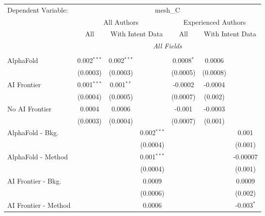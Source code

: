 \begingroup
\centering
\begin{tabular}{lcccccc}
   \tabularnewline \midrule \midrule
   Dependent Variable: & \multicolumn{6}{c}{mesh\_C}\\
 & \multicolumn{3}{c}{All Authors} & \multicolumn{3}{c}{Experienced Authors} \\
\cmidrule(lr){2-4} \cmidrule(lr){5-7}
 & \multicolumn{1}{c}{All} & \multicolumn{2}{c}{With Intent Data} & \multicolumn{1}{c}{All} & \multicolumn{2}{c}{With Intent Data} \\
\cmidrule(lr){2-2} \cmidrule(lr){3-4} \cmidrule(lr){5-5} \cmidrule(lr){6-7}
 & \multicolumn{6}{c}{\textit{All Fields}} \\ \\
   AlphaFold               & 0.002$^{***}$ & 0.002$^{***}$ &               & 0.0008$^{*}$ & 0.0006   &   \\   
                           & (0.0003)      & (0.0003)      &               & (0.0005)     & (0.0008) &   \\   
   AI Frontier             & 0.001$^{***}$ & 0.001$^{**}$  &               & -0.0002      & -0.0004  &   \\   
                           & (0.0004)      & (0.0005)      &               & (0.0007)     & (0.002)  &   \\   
   No AI Frontier          & 0.0004        & 0.0006        &               & -0.001       & -0.0003  &   \\   
                           & (0.0003)      & (0.0004)      &               & (0.0007)     & (0.001)  &   \\   
   AlphaFold - Bkg.        &               &               & 0.002$^{***}$ &              &          & 0.001\\   
                           &               &               & (0.0004)      &              &          & (0.001)\\   
   AlphaFold - Method      &               &               & 0.001$^{***}$ &              &          & -0.00007\\   
                           &               &               & (0.0004)      &              &          & (0.001)\\   
   AI Frontier - Bkg.      &               &               & 0.0009        &              &          & 0.0009\\   
                           &               &               & (0.0006)      &              &          & (0.002)\\   
   AI Frontier - Method    &               &               & 0.0006        &              &          & -0.003$^{*}$\\   

\end{tabular}
